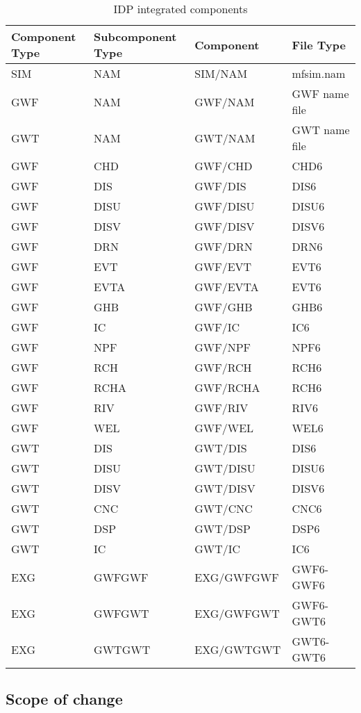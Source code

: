 \begin{table}[H]
\caption{IDP integrated components}
\small
\begin{center}
\begin{tabular*}{\columnwidth}{l l l l}
\hline
\hline
\textbf{Component Type} & \textbf{Subcomponent Type} & \textbf{Component} & \textbf{File Type} \\
\hline
SIM & NAM & SIM/NAM & mfsim.nam \\
GWF & NAM & GWF/NAM & GWF name file \\
GWT & NAM & GWT/NAM & GWT name file \\
GWF & CHD & GWF/CHD & CHD6 \\
GWF & DIS & GWF/DIS & DIS6 \\
GWF & DISU & GWF/DISU & DISU6 \\
GWF & DISV & GWF/DISV & DISV6 \\
GWF & DRN & GWF/DRN & DRN6 \\
GWF & EVT & GWF/EVT & EVT6 \\
GWF & EVTA & GWF/EVTA & EVT6 \\
GWF & GHB & GWF/GHB & GHB6 \\
GWF & IC & GWF/IC & IC6 \\
GWF & NPF & GWF/NPF & NPF6 \\
GWF & RCH & GWF/RCH & RCH6 \\
GWF & RCHA & GWF/RCHA & RCH6 \\
GWF & RIV & GWF/RIV & RIV6 \\
GWF & WEL & GWF/WEL & WEL6 \\
GWT & DIS & GWT/DIS & DIS6 \\
GWT & DISU & GWT/DISU & DISU6 \\
GWT & DISV & GWT/DISV & DISV6 \\
GWT & CNC & GWT/CNC & CNC6 \\
GWT & DSP & GWT/DSP & DSP6 \\
GWT & IC & GWT/IC & IC6 \\
EXG & GWFGWF & EXG/GWFGWF & GWF6-GWF6 \\
EXG & GWFGWT & EXG/GWFGWT & GWF6-GWT6 \\
EXG & GWTGWT & EXG/GWTGWT & GWT6-GWT6 \\
\hline
\end{tabular*}
\label{table:idmsupported}
\end{center}
\normalsize
\end{table}

\subsection{Scope of change}

